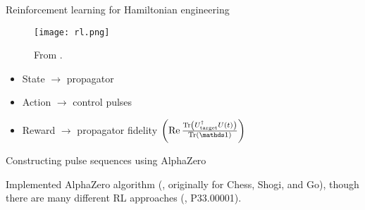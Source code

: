\documentclass{beamer}
\begin{document}
\begin{frame}{Reinforcement learning for Hamiltonian engineering}

\begin{figure}
\centering
\texttt{[image: rl.png]}

From \cite{sutton2018reinforcement}.
\end{figure}

\begin{itemize}
    \item State $\to$ propagator
    \item Action $\to$ control pulses
    \item Reward $\to$ propagator fidelity $\left(\Re{
        \frac{\Tr{U_\text{target}^\dagger U(t)}}{\Tr{\identity}}
    }\right)$
\end{itemize}


\end{frame}

\begin{frame}{Constructing pulse sequences using AlphaZero}

Implemented AlphaZero algorithm (\cite{Silver1140}, originally for Chess, Shogi, and Go), though there are many different RL approaches (\cite{peng2021deep}, P33.00001).

\begin{figure}
\centering
\scalebox{.7}{

}
\end{figure}


\end{frame}
\end{document}
